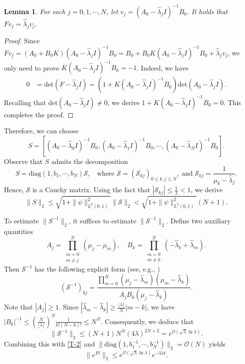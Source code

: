 \documentclass[a4paper]{article}
\newtheorem{lemma}[theorem]{Lemma}
\numberwithin{equation}{section}
\begin{document}
\begin{lemma}\label{eigvecof-F1}
For each $j=0,1,\cdots,N$, let $v_j=(A_0-\hat{\lambda}_jI)^{-1}B_0$. It holds that
$Fv_j=\hat{\lambda}_jv_j.$
\end{lemma}
\begin{proof}
Since $Fv_j=(A_0+B_0K)(A_0-\hat{\lambda}_jI)^{-1}B_0=B_0+B_0K(A_0-\hat{\lambda}_jI)^{-1}B_0+\hat{\lambda}_jv_j$, we only need to prove
$K(A_0-\hat{\lambda}_jI)^{-1}B_0=-1$. Indeed, we have
\begin{equation*}
\begin{aligned}
 0&=\text{det}\left(F-\hat{\lambda}_jI\right)=(1+K(A_0-\hat{\lambda}_jI)^{-1}B_0)\text{det}(A_0-\hat{\lambda}_jI).
\end{aligned}
\end{equation*}
Recalling that $\text{det}(A_0-\hat{\lambda}_jI)\neq 0$, we derive $1+K(A_0-\hat{\lambda}_jI)^{-1}B_0=0$. This completes the proof.
\end{proof}
Therefore, we can choose 
\begin{equation}\label{S-sec}
S=[(A_0-\hat{\lambda}_0I)^{-1}B_0,(A_0-\hat{\lambda}_1I)^{-1}B_0,\cdots,(A_0-\hat{\lambda}_NI)^{-1}B_0].\end{equation} Observe that $S$ admits the decomposition $$S=\text{diag}(1,b_1,\cdots,b_N)\mathcal{S},\;\;\text{ where }
\mathcal{S}=(\mathcal{S}_{kj})_{0\le k,j\le N},\;\text{and}\;\mathcal{S}_{kj}=\frac{1}{\mu_k-\hat{\lambda}_j}.$$
Hence, $\mathcal S$ is a Cauchy matrix. Using the fact that $|\mathcal{S}_{kj}|\le \frac{1}{\lambda}<1$, we derive
\begin{equation} \label{T-2}
\|S\|_2\le \sqrt{1+\|\psi\|_{L^2(0,1)}^2}\|\mathcal{S}\|_{2}< \sqrt{1+\|\psi\|_{L^2(0,1)}^2}(N+1).
\end{equation}

To estimate $\|S^{-1}\|_2$, it suffices to estimate $\|\mathcal{S}^{-1}\|_2$. Define two auxiliary quantities
$$A_j = \prod_{\substack{m=0 \\ m \neq j}}^{N} (\mu_j - \mu_m), \quad B_k = \prod_{\substack{m=0 \\ m \neq k}}^{N} (-\hat{\lambda}_k + \hat{\lambda}_m).$$
Then $\mathcal{S}^{-1}$ has the following explicit form (see, e.g., \cite{Ss})
\begin{equation}\label{inverse-dec}
(\mathcal{S}^{-1})_{kj} = \frac{\prod_{m=0}^{N} (\mu_j - \hat{\lambda}_m)(\mu_m - \hat{\lambda}_k)}{A_j B_k(\mu_j - \hat{\lambda}_k)} .
\end{equation}
Note that $|A_j|\ge 1$. Since $|\hat{\lambda}_m-\hat{\lambda}_k|\ge \frac{\lfloor\lambda\rfloor}{N}|m-k|$, we have $|B_k|^{-1}\le \left(\frac{N}{\lfloor\lambda\rfloor}\right)^N\frac{1}{k!(N-k)!}\le N^N$. Consequently, we deduce that
\begin{equation}\label{T-1-2}
\|\mathcal{S}^{-1}\|_2\le (N+1)N^N(4\lambda)^{2N+2}=e^{\mathcal{O}(\sqrt{\lambda}\ln \lambda)}.
\end{equation}
Combining this with \eqref{T-2} and $\|\text{diag}(1,b^{-1}_1,\cdots,b^{-1}_N)\|_2=\mathcal{O}(N)$ yields
\begin{equation} \label{F-NORM}
\|e^{Ft}\|_2\le e^{\mathcal{O}(\sqrt{\lambda}\ln \lambda)}e^{-3\lambda t}.
\end{equation}
\end{document}
